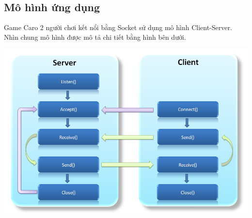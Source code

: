 \documentclass[a4paper]{article}
\begin{document}
\subsection{Mô hình ứng dụng}
\begin{par}
    Game Caro 2 người chơi kết nổi bằng Socket sử dụng mô hình Client-Server. Nhìn chung mô hình được mô tả chi tiết bằng hình bên dưới.
\end{par}

\includegraphics[width=14cm]{images/socket_client_server.png}
\end{document}
